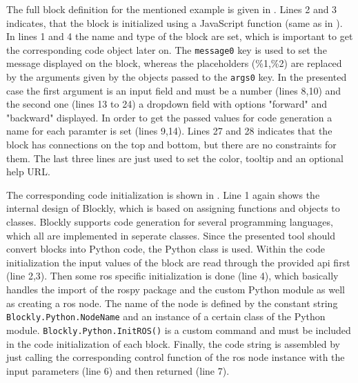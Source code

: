 The full block definition for the mentioned example is given in . Lines 2 and 3 indicates, that the block is initialized using a JavaScript function (same as in ). In lines 1 and 4 the name and type of the block are set, which is important to get the corresponding code object later on. The \lstinline!message0! key is used to set the message displayed on the block, whereas the placeholders (\%1,\%2) are replaced by the arguments given by the objects passed to the \lstinline!args0! key. In the presented case the first argument is an input field and must be a number (lines 8,10) and the second one (lines 13 to 24) a dropdown field with options "forward" and "backward" displayed. In order to get the passed values for code generation a name for each paramter is set (lines 9,14). Lines 27 and 28 indicates that the block has connections on the top and bottom, but there are no constraints for them. The last three lines are just used to set the color, tooltip and an optional help URL. \\


\begin{figure}[htbp]
	
\end{figure}

The corresponding code initialization is shown in . Line 1 again shows the internal design of Blockly, which is based on assigning functions and objects to classes. Blockly supports code generation for several programming languages, which all are implemented in seperate classes. Since the presented tool should convert blocks into Python code, the Python class is used. Within the code initialization the input values of the block are read through the provided \gls{api} first (line 2,3). Then some \gls{ros} specific initialization is done (line 4), which basically handles the import of the rospy package and the custom Python module as well as creating a \gls{ros} node. The name of the node is defined by the constant string \lstinline!Blockly.Python.NodeName! and an instance of a certain class of the Python module. \lstinline!Blockly.Python.InitROS()! is a custom command and must be included in the code initialization of each block. Finally, the code string is assembled by just calling the corresponding control function of the \gls{ros} node instance with the input parameters (line 6) and then returned (line 7).

